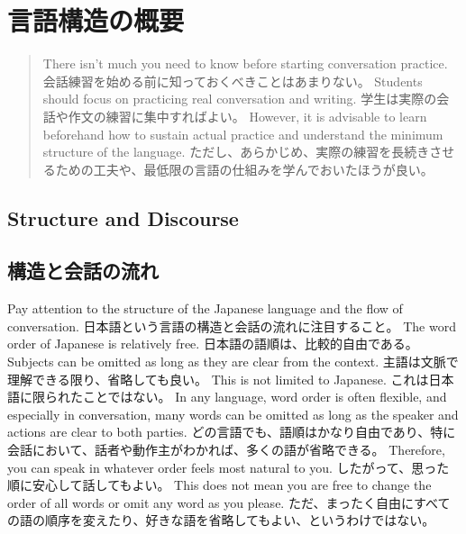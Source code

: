 \documentclass[uplatex,dvipdfmx,b5paper,english,10pt]{jsbook}
\newif\ifOUTLINEOFLANGUAGESTRUCTURE
\newif\ifVOICE
\newif\ifSHORTNOTES
\begin{document}
\ifVOICE

\fi%

\ifSHORTNOTES

\fi%

\tableofcontents

\mainmatter


\ifOUTLINEOFLANGUAGESTRUCTURE
\ifEnglish
\chapter{Outline of Language Structure}
\else
\chapter{言語構造の概要}
\fi

\begin{abstract}
\ifEnglish
There isn't much you need to know before starting conversation practice.
\else
会話練習を始める前に知っておくべきことはあまりない。
\fi
\ifEnglish
Students should focus on practicing real conversation and writing.
\else
学生は実際の会話や作文の練習に集中すればよい。
\fi
\ifEnglish
However, it is advisable to learn beforehand how to sustain actual practice and understand the minimum structure of the language.
\else
ただし、あらかじめ、実際の練習を長続きさせるための工夫や、最低限の言語の仕組みを学んでおいたほうが良い。
\fi
\end{abstract}

\ifEnglish
\section{Structure and Discourse}
\else
\section{構造と会話の流れ}
\fi

\ifEnglish
Pay attention to the structure of the Japanese language and the flow of conversation.
\else
日本語という言語の構造と会話の流れに注目すること。
\fi
\ifEnglish
The word order of Japanese is relatively free.
\else
日本語の語順は、比較的自由である。
\fi
\ifEnglish
Subjects can be omitted as long as they are clear from the context.
\else
主語は文脈で理解できる限り、省略しても良い。
\fi
\ifEnglish
This is not limited to Japanese.
\else
これは日本語に限られたことではない。
\fi
\ifEnglish
In any language, word order is often flexible, and especially in conversation, many words can be omitted as long as the speaker and actions are clear to both parties.
\else
どの言語でも、語順はかなり自由であり、特に会話において、話者や動作主がわかれば、多くの語が省略できる。
\fi
\ifEnglish
Therefore, you can speak in whatever order feels most natural to you.
\else
したがって、思った順に安心して話してもよい。
\fi
\ifEnglish
This does not mean you are free to change the order of all words or omit any word as you please.
\else
ただ、まったく自由にすべての語の順序を変えたり、好きな語を省略してもよい、というわけではない。
\fi
\end{document}
